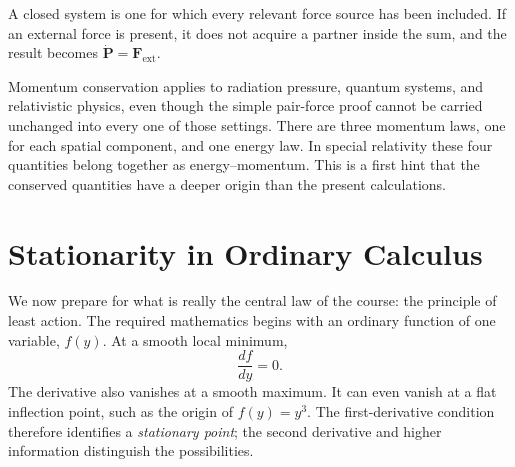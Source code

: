 A closed system is one for which every relevant force source has been included.
If an external force is present, it does not acquire a partner inside the sum,
and the result becomes \(\dot{\mathbf P}=\mathbf F_{\mathrm{ext}}\).

\begin{classroomqa}

\end{classroomqa}

Momentum conservation applies to radiation pressure, quantum systems, and
relativistic physics, even though the simple pair-force proof cannot be carried
unchanged into every one of those settings. There are three momentum laws, one
for each spatial component, and one energy law. In special relativity these
four quantities belong together as energy--momentum. This is a first hint that
the conserved quantities have a deeper origin than the present calculations.

\begin{classroomqa}

\end{classroomqa}

\section{Stationarity in Ordinary Calculus}

We now prepare for what is really the central law of the course: the principle
of least action. The required mathematics begins with an ordinary function of
one variable, \(f(y)\). At a smooth local minimum,
\begin{equation}
 \frac{df}{dy}=0.
 \label{eq:l02-one-variable-stationary}
\end{equation}
The derivative also vanishes at a smooth maximum. It can even vanish at a flat
inflection point, such as the origin of \(f(y)=y^3\). The first-derivative
condition therefore identifies a \emph{stationary point}; the second derivative
and higher information distinguish the possibilities.

